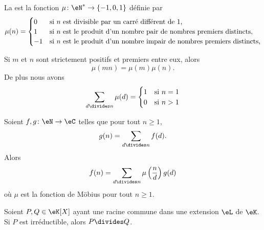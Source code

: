 \begin{definition}  \label{DefWXBkOxg}
    La  est la fonction \( \mu\colon \eN^*\to \{ -1,0,1 \}\) définie par
    \begin{equation}
        \mu(n)=\begin{cases}
            0    &   \text{si \( n\) est divisible par un carré différent de \( 1\),}\\
            1    &   \text{si \( n\) est le produit d'un nombre pair de nombres premiers distincts,}\\
            -1    &    \text{si \( n\) est le produit d'un nombre impair de nombres premiers distincts,}
        \end{cases}
    \end{equation}
\end{definition}

\begin{proposition}
    Si \( m\) et \( n\) sont strictement positifs et premiers entre eux, alors
    \begin{equation}
        \mu(mn)=\mu(m)\mu(n).
    \end{equation}
    De plus nous avons
    \begin{equation}
        \sum_{d\divides n}\mu(d)=\begin{cases}
            1    &   \text{si \( n=1\)}\\
            0    &    \text{si \( n>1\)}
        \end{cases}
    \end{equation}
\end{proposition}

\begin{proposition}    \label{PropLBZoIoO}
    Soient \( f,g\colon \eN\to \eC\) telles que pour tout \( n\geq 1\),
    \begin{equation}
        g(n)=\sum_{d\divides n}f(d).
    \end{equation}
    Alors
    \begin{equation}
        f(n)=\sum_{d\divides n}\mu\left( \frac{ n }{ d } \right)g(d)
    \end{equation}
    où \( \mu\) est la fonction de Möbius pour tout \( n\geq 1\).
\end{proposition}

\begin{lemma}   \label{LemRGuWqNu}
    Soient \( P,Q\in \eK[X]\) ayant une racine commune dans une extension \( \eL\) de \( \eK\). Si \( P\) est irréductible, alors \( P\divides Q\).
\end{lemma}


